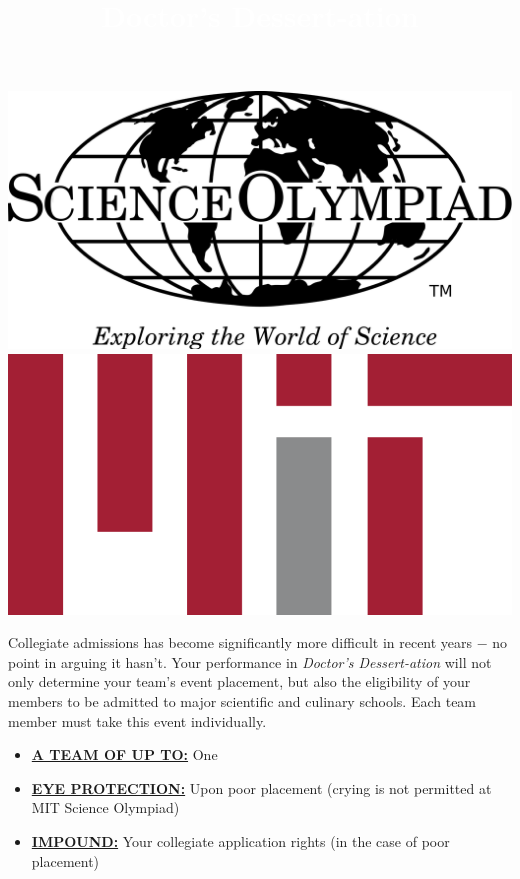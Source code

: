 \documentclass[a4paper]{article}
\title{
\vspace{-3em}
\begin{tcolorbox}[colback=cardinal,colframe=battleshipgrey]
\Huge\centering \textcolor{white}{Doctor's Dessert-ation}
\end{tcolorbox}
\vspace{-3em}
}
\date{}
\begin{document}
 
\maketitle

\vspace{-115pt}
\includegraphics[scale=.05]{Images/scioly.png}\hspace{300pt}\includegraphics[scale=.1]{Images/MITLogo.png}
\vspace{24pt}

%
{Collegiate admissions has become significantly more difficult in recent years $-$ no point in arguing it hasn't. Your performance in \textit{Doctor's Dessert-ation} will not only determine your team's event placement, but also the eligibility of your members to be admitted to major scientific and culinary schools. Each team member must take this event individually.  \begin{itemize} \item \textbf{\underline{\textsc{A TEAM OF UP TO:}}} One \item \textbf{\underline{\textsc{EYE PROTECTION:}}} Upon poor placement (crying is not permitted at MIT Science Olympiad) \item \textbf{\underline{\textsc{IMPOUND:}}} Your collegiate application rights (in the case of poor placement) \end{itemize}}%
\end{document}
